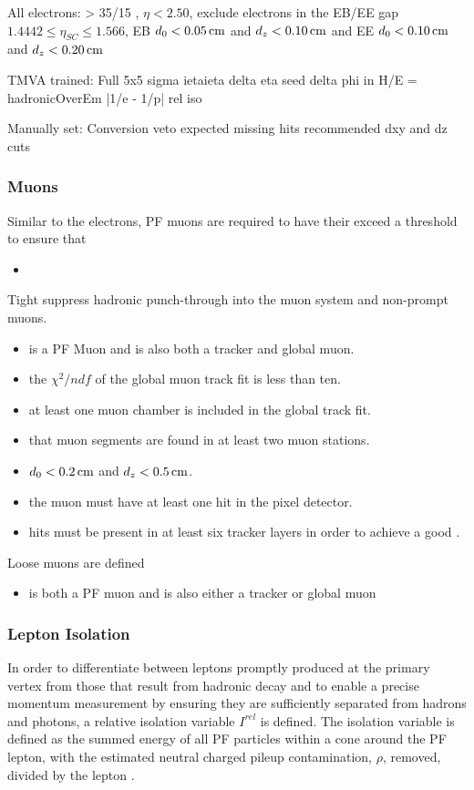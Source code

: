 All electrons: \pT > 35/15 \GeVc, $\eta < 2.50$, exclude electrons in the EB/EE gap $1.4442 \leq \eta_{SC} \leq 1.566$, EB $d_{0} < 0.05\,\text{cm}$ and $d_{z} < 0.10\,\text{cm}$ and EE $d_{0} < 0.10\,\text{cm}$ and $d_{z} < 0.20\,\text{cm}$

TMVA trained: Full 5x5 sigma ietaieta
delta eta seed
delta phi in
H/E = hadronicOverEm
|1/e - 1/p|
rel iso

Manually set: 
Conversion veto
expected missing hits
recommended dxy and dz cuts

\subsubsection{Muons}
Similar to the electrons, PF muons are required to have their \pt exceed a threshold to ensure that 

\begin{itemize}
\item 
\end{itemize}



Tight  
suppress hadronic punch-through into the muon system and non-prompt muons.
\begin{itemize}
\item is a PF Muon and is also both a tracker and global muon.
\item the $\chi^{2}/ndf$ of the global muon track fit is less than ten. 
\item at least one muon chamber is included in the global track fit.
\item that muon segments are found in at least two muon stations.
\item $d_{0} < 0.2\,\text{cm}$ and $d_{z} < 0.5\,\text{cm}$.
\item the muon must have at least one hit in the pixel detector.
\item hits must be present in at least six tracker layers in order to achieve a good \pT.
\end{itemize}

Loose muons are defined 
\begin{itemize}
\item is both a PF muon and is also either a tracker or global muon
\end{itemize}

\cite{Chatrchyan:2012xi}


\subsubsection{Lepton Isolation}
In order to differentiate between leptons promptly produced at the primary vertex from those that result from hadronic decay and to enable a precise momentum measurement by ensuring they are sufficiently separated from hadrons and photons, a relative isolation variable $I^{rel}$ is defined.
The isolation variable is defined as the summed energy of all PF particles within a cone around the PF lepton, with the estimated neutral charged pileup contamination, $\rho$, removed, divided by the lepton \pT.


